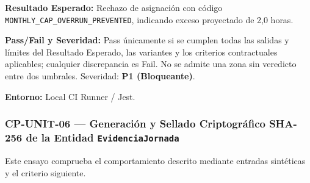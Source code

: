 \par\noindent\textbf{Resultado Esperado:} Rechazo de asignación con código \texttt{M\allowbreak{}O\allowbreak{}N\allowbreak{}T\allowbreak{}H\allowbreak{}L\allowbreak{}Y\allowbreak{}\_\allowbreak{}C\allowbreak{}A\allowbreak{}P\allowbreak{}\_\allowbreak{}O\allowbreak{}V\allowbreak{}E\allowbreak{}R\allowbreak{}R\allowbreak{}U\allowbreak{}N\allowbreak{}\_\allowbreak{}P\allowbreak{}R\allowbreak{}E\allowbreak{}V\allowbreak{}E\allowbreak{}N\allowbreak{}T\allowbreak{}E\allowbreak{}D\allowbreak{}}, indicando exceso proyectado de 2,0 horas.\par
\par\noindent\textbf{Pass/Fail y Severidad:} Pass únicamente si se cumplen todas las salidas y límites del Resultado Esperado, las variantes y los criterios contractuales aplicables; cualquier discrepancia es Fail. No se admite una zona sin veredicto entre dos umbrales. Severidad: \textbf{P1 (Bloqueante)}.\par
\par\noindent\textbf{Entorno:} Local CI Runner / Jest.\par






\subsubsection*{CP-UNIT-06 — Generación y Sellado Criptográfico SHA-256 de la Entidad \texttt{E\allowbreak{}v\allowbreak{}i\allowbreak{}d\allowbreak{}e\allowbreak{}n\allowbreak{}c\allowbreak{}i\allowbreak{}a\allowbreak{}J\allowbreak{}o\allowbreak{}r\allowbreak{}n\allowbreak{}a\allowbreak{}d\allowbreak{}a\allowbreak{}}}\label{sec:9-cp-unit-06}
Este ensayo comprueba el comportamiento descrito mediante entradas sintéticas y el criterio siguiente.

